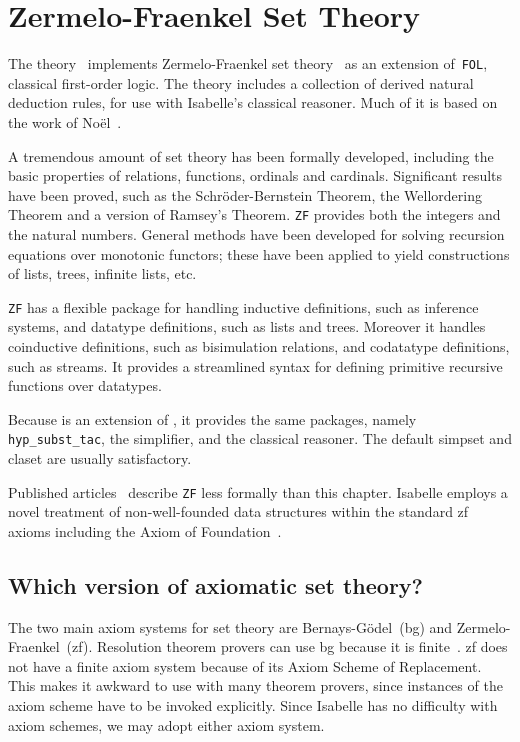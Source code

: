 \chapter{Zermelo-Fraenkel Set Theory}

The theory~ implements Zermelo-Fraenkel set
theory~\cite{halmos60,suppes72} as an extension of~\texttt{FOL}, classical
first-order logic.  The theory includes a collection of derived natural
deduction rules, for use with Isabelle's classical reasoner.  Much
of it is based on the work of No\"el~\cite{noel}.

A tremendous amount of set theory has been formally developed, including the
basic properties of relations, functions, ordinals and cardinals.  Significant
results have been proved, such as the Schr\"oder-Bernstein Theorem, the
Wellordering Theorem and a version of Ramsey's Theorem.  \texttt{ZF} provides
both the integers and the natural numbers.  General methods have been
developed for solving recursion equations over monotonic functors; these have
been applied to yield constructions of lists, trees, infinite lists, etc.

\texttt{ZF} has a flexible package for handling inductive definitions,
such as inference systems, and datatype definitions, such as lists and
trees.  Moreover it handles coinductive definitions, such as
bisimulation relations, and codatatype definitions, such as streams.  It
provides a streamlined syntax for defining primitive recursive functions over
datatypes. 

Because {\ZF} is an extension of {\FOL}, it provides the same
packages, namely \texttt{hyp_subst_tac}, the simplifier, and the
classical reasoner.  The default simpset and claset are usually
satisfactory.

Published articles~\cite{paulson-set-I,paulson-set-II} describe \texttt{ZF}
less formally than this chapter.  Isabelle employs a novel treatment of
non-well-founded data structures within the standard {\sc zf} axioms including
the Axiom of Foundation~\cite{paulson-final}.


\section{Which version of axiomatic set theory?}
The two main axiom systems for set theory are Bernays-G\"odel~({\sc bg})
and Zermelo-Fraenkel~({\sc zf}).  Resolution theorem provers can use {\sc
  bg} because it is finite~\cite{boyer86,quaife92}.  {\sc zf} does not
have a finite axiom system because of its Axiom Scheme of Replacement.
This makes it awkward to use with many theorem provers, since instances
of the axiom scheme have to be invoked explicitly.  Since Isabelle has no
difficulty with axiom schemes, we may adopt either axiom system.

